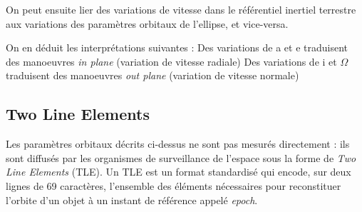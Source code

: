 \documentclass{article}
\begin{document}
On peut ensuite lier des variations de vitesse dans le référentiel inertiel terrestre aux variations des paramètres orbitaux de l'ellipse, et vice-versa. 

\vspace{0.3cm}

\noindent{}
\vspace{0.3cm}

On en déduit les interprétations suivantes : 
Des variations de a et e traduisent des manoeuvres \textit{in plane}  (variation de vitesse radiale)
Des variations de i et $\Omega$ traduisent des  manoeuvres \textit{out plane} (variation de vitesse normale)

\subsection{Two Line Elements}

Les paramètres orbitaux décrits ci-dessus ne sont pas mesurés directement : ils sont diffusés par les organismes de surveillance de l'espace sous la forme de \textit{Two Line Elements} (TLE).
Un TLE est un format standardisé qui encode, sur deux lignes de 69 caractères, l'ensemble des éléments nécessaires pour reconstituer l'orbite d'un objet à un instant de référence appelé \textit{epoch}.
\end{document}
